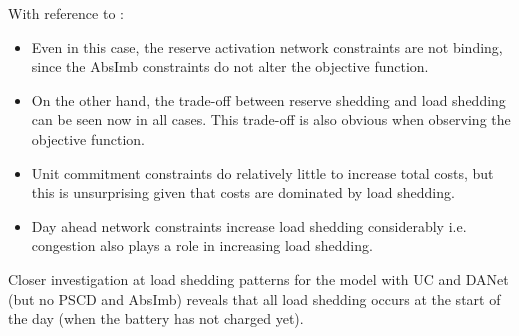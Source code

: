 \documentclass[number,times]{elsarticle}
\begin{document}
With reference to :

\begin{itemize}
    \item Even in this case, the reserve activation network constraints are not binding, since the AbsImb constraints do not alter the objective function.
    \item On the other hand, the trade-off between reserve shedding and load shedding can be seen now in all cases. This trade-off is also obvious when observing the objective function.
    \item Unit commitment constraints do relatively little to increase total costs, but this is unsurprising given that costs are dominated by load shedding.
    \item Day ahead network constraints increase load shedding considerably i.e. congestion also plays a role in increasing load shedding.
\end{itemize}

Closer investigation at load shedding patterns for the model with UC and DANet (but no PSCD and AbsImb) reveals that all load shedding occurs at the start of the day (when the battery has not charged yet). 

\end{document}

